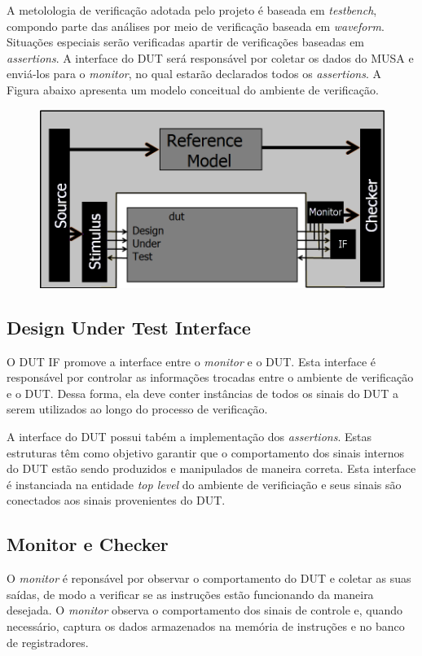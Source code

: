 \documentclass{article}
\begin{document}
  A metolologia de verificação adotada pelo projeto é baseada em \textit{testbench}, compondo parte das análises por meio de verificação baseada em \textit{waveform}. Situações especiais serão verificadas apartir de verificações baseadas em \textit{assertions}. A interface do DUT será responsável por coletar os dados do MUSA e enviá-los para o \textit{monitor}, no qual estarão declarados todos os \textit{assertions}. A Figura abaixo apresenta um modelo conceitual do ambiente de verificação.
		
	\begin{figure}[H]
    	\centering
    	\includegraphics[width=.7\linewidth]{pictures/Diagrama.png}
  	\end{figure} 

	\subsection{Design Under Test Interface}
	
	O DUT IF promove a interface entre o \textit{monitor} e o DUT. Esta interface é responsável por controlar as informações trocadas entre o ambiente de verificação e o DUT. Dessa forma, ela deve conter instâncias de todos os sinais do DUT a serem utilizados ao longo do processo de verificação.
	
  A interface do DUT possui tabém a implementação dos \textit{assertions}. Estas estruturas têm como objetivo garantir que o comportamento dos sinais internos do DUT estão sendo produzidos e manipulados de maneira correta. Esta interface é instanciada na entidade \textit{top level} do ambiente de verificiação e seus sinais são conectados aos sinais provenientes do DUT.

	\subsection{Monitor e Checker}
	
  O \textit{monitor} é reponsável por observar o comportamento do DUT e coletar as suas saídas, de modo a verificar se as instruções estão funcionando da maneira desejada. O \textit{monitor} observa o comportamento dos sinais de controle e, quando necessário, captura os dados armazenados na memória de instruções e no banco de registradores.
	
\end{document}
